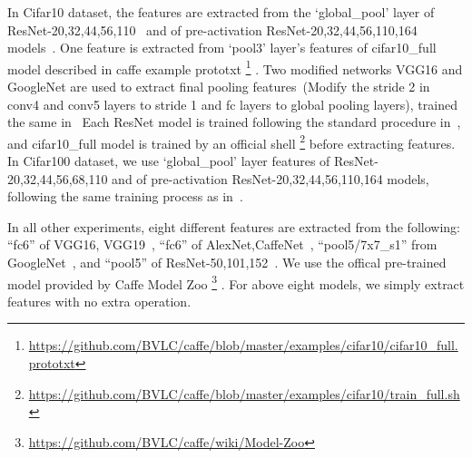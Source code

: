 \documentclass[10pt,twocolumn,letterpaper]{article}
\begin{document}
In Cifar10 dataset, the features are extracted from the `global\_pool' layer of ResNet-20,32,44,56,110~\cite{he2015deep} and of pre-activation ResNet-20,32,44,56,110,164 models~\cite{he2016identity}.
One feature is extracted from `pool3' layer's features of cifar10\_full model described in caffe example prototxt
\footnote{\url{https://github.com/BVLC/caffe/blob/master/examples/cifar10/cifar10_full.prototxt}}
.
Two modified networks VGG16 and GoogleNet are used to extract final pooling features~(Modify the stride 2 in conv4 and conv5 layers to stride 1 and fc layers to global pooling layers), trained the same in~\cite{he2015deep}
Each ResNet model is trained following the standard procedure in~\cite{he2015deep,he2016identity}, and cifar10\_full model is trained by an official shell
\footnote{\url{https://github.com/BVLC/caffe/blob/master/examples/cifar10/train_full.sh}}
before extracting features.
In Cifar100 dataset, we use `global\_pool' layer features of ResNet-20,32,44,56,68,110 and of pre-activation ResNet-20,32,44,56,110,164 models, following the same training process as in~\cite{he2015deep,he2016identity}.

In all other experiments, eight different features are extracted from the following:
``fc6'' of VGG16, VGG19~\cite{chatfield2014return},
``fc6'' of AlexNet,CaffeNet~\cite{krizhevsky2012imagenet},
``pool5/7x7\_s1'' from GoogleNet~\cite{szegedy2015going},
and ``pool5'' of ResNet-50,101,152~\cite{he2015deep}.
We use the offical pre-trained model provided by Caffe Model Zoo
\footnote{\url{https://github.com/BVLC/caffe/wiki/Model-Zoo}}
.
For above eight models, we simply extract features with no extra operation.
\end{document}
